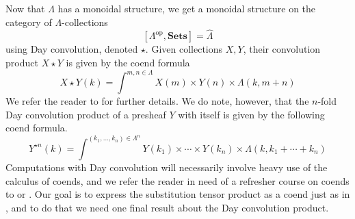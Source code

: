 \documentclass{amsbook} %
\newcommand{\mb}{\mathbf}
\numberwithin{section}{chapter}
\begin{document}
Now that $\mathbb{\Lambda}$ has a monoidal structure, we get a monoidal structure on the category of $\mathbb{\Lambda}$-collections
  \[
    [\mathbb{\Lambda}^{\textrm{op}}, \mb{Sets}] = \hat{\mathbb{\Lambda}}
  \]
using Day convolution, denoted $\star$.  Given collections $X, Y$, their convolution product $X \star Y$ is given by the coend formula
  \[
    X \star Y (k) = \int^{m,n \in \mathbb{\Lambda}} X(m) \times Y(n) \times \mathbb{\Lambda}(k, m+n)
  \]
We refer the reader to \cite{day-thesis} for further details.  We do note, however, that the $n$-fold Day convolution product of a presheaf $Y$ with itself is given by the following coend formula.
  \[
    Y^{\star n}(k) = \int^{(k_{1}, \ldots, k_{n}) \in \mathbb{\Lambda}^{n}} Y(k_{1}) \times \cdots \times Y(k_{n}) \times \mathbb{\Lambda}(k, k_{1} + \cdots + k_{n})
  \]
Computations with Day convolution will necessarily involve heavy use of the calculus of coends, and we refer the reader in need of a refresher course on coends to \cite{maclane-catwork} or \cite{loregian}.  Our goal is to express the substitution tensor product as a coend just as in \cite{kelly-op}, and to do that we need one final result about the Day convolution product.
\end{document}

